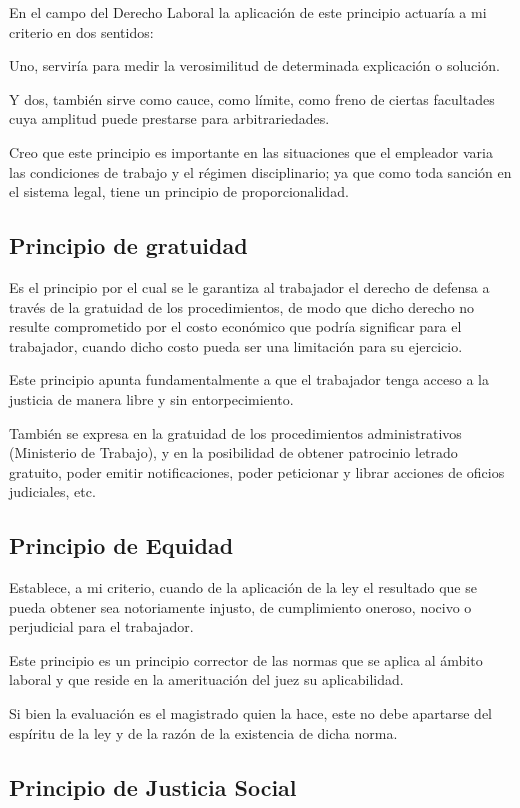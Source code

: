 \documentclass[a4paper]{article}
\begin{document}
En el campo del Derecho Laboral la aplicación de este principio actuaría a mi criterio en dos sentidos: 

Uno, serviría para medir la verosimilitud de determinada explicación o solución. 

Y dos, también sirve como cauce, como límite, como freno de ciertas facultades cuya amplitud puede prestarse para arbitrariedades. 

Creo que este principio es importante en las situaciones que el empleador varia las condiciones de trabajo y el régimen disciplinario;  ya que como toda sanción en el sistema legal, tiene un principio de proporcionalidad. 

\subsection{Principio de gratuidad}

Es el principio por el cual se le garantiza al trabajador el derecho de defensa a través de la gratuidad de los procedimientos, de modo que dicho derecho no resulte comprometido por el costo económico que podría significar para el trabajador, cuando dicho costo pueda ser una limitación para su ejercicio. 

Este principio apunta fundamentalmente a que el trabajador tenga acceso a la justicia de manera libre y sin entorpecimiento. 

También se expresa en la gratuidad de los procedimientos administrativos (Ministerio de Trabajo), y en la posibilidad de obtener patrocinio letrado gratuito, poder emitir notificaciones, poder peticionar y librar acciones de oficios judiciales, etc.

\subsection{Principio de Equidad}

Establece, a mi criterio, cuando de la aplicación de la ley el resultado  que se pueda obtener sea notoriamente injusto, de cumplimiento oneroso, nocivo o perjudicial para el trabajador.

Este principio es un principio corrector de las normas que se aplica al ámbito laboral y que reside en la amerituación del juez su aplicabilidad.

Si bien la evaluación es el magistrado quien la hace, este no debe apartarse del espíritu de la ley y de la razón de la existencia de dicha norma.

\subsection{Principio de Justicia Social}
\end{document}
